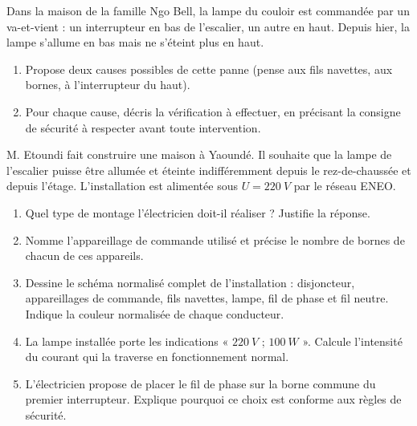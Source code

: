 \documentclass[11pt]{article}
\newcounter{popsec}
\newcounter{popsub}
\newcommand{\courssub}[1]{%
  \stepcounter{popsub}%
  \par\vspace{9pt}\noindent{\popxbold\fontsize{11.5}{13}\selectfont\color{popink}{\color{poporange}\thepopsec.\thepopsub}\hspace{6pt}#1}\par\nopagebreak\vspace{4pt}
}
\begin{document}
\begin{exercice}
Dans la maison de la famille Ngo Bell, la lampe du couloir est commandée par un va-et-vient : un interrupteur en bas de l'escalier, un autre en haut. Depuis hier, la lampe s'allume en bas mais ne s'éteint plus en haut.
\begin{enumerate}
\item Propose deux causes possibles de cette panne (pense aux fils navettes, aux bornes, à l'interrupteur du haut).
\item Pour chaque cause, décris la vérification à effectuer, en précisant la consigne de sécurité à respecter avant toute intervention.
\end{enumerate}
\end{exercice}

\courssub{Je me prépare au Bac}

\begin{exercice}
M. Etoundi fait construire une maison à Yaoundé. Il souhaite que la lampe de l'escalier puisse être allumée et éteinte indifféremment depuis le rez-de-chaussée et depuis l'étage. L'installation est alimentée sous $U = \SI{220}{V}$ par le réseau ENEO.
\begin{enumerate}
\item Quel type de montage l'électricien doit-il réaliser ? Justifie la réponse.
\item Nomme l'appareillage de commande utilisé et précise le nombre de bornes de chacun de ces appareils.
\item Dessine le schéma normalisé complet de l'installation : disjoncteur, appareillages de commande, fils navettes, lampe, fil de phase et fil neutre. Indique la couleur normalisée de chaque conducteur.
\item La lampe installée porte les indications « $\SI{220}{V}$ ; $\SI{100}{W}$ ». Calcule l'intensité du courant qui la traverse en fonctionnement normal.
\item L'électricien propose de placer le fil de phase sur la borne commune du premier interrupteur. Explique pourquoi ce choix est conforme aux règles de sécurité.
\end{enumerate}
\end{exercice}
\end{document}
